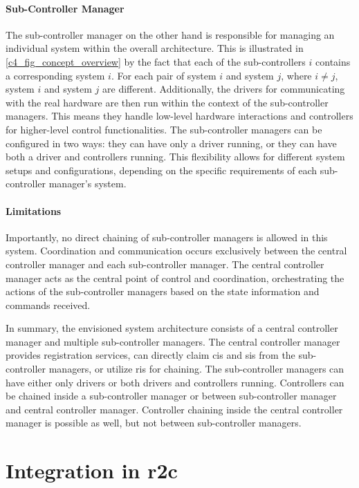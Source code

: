 \paragraph{Sub-Controller Manager}
The sub-controller manager on the other hand is responsible for managing an individual system within the overall architecture. This is illustrated in \autoref{c4_fig_concept_overview} by the fact that each of the sub-controllers $i$ contains a corresponding system $i$. For each pair of system $i$ and system $j$, where $i\neq j$, system $i$ and system $j$ are different. \newline
Additionally, the drivers for communicating with the real hardware are then run within the context of the sub-controller managers. This means they handle low-level hardware interactions and controllers for higher-level control functionalities.\newline
The sub-controller managers can be configured in two ways: they can have only a driver running, or they can have both a driver and controllers running. This flexibility allows for different system setups and configurations, depending on the specific requirements of each sub-controller manager's system.
\paragraph{Limitations}
Importantly, no direct chaining of sub-controller managers is allowed in this system. Coordination and communication occurs exclusively between the central controller manager and each sub-controller manager. The central controller manager acts as the central point of control and coordination, orchestrating the actions of the sub-controller managers based on the state information and commands received.

In summary, the envisioned system architecture consists of a central controller manager and multiple sub-controller managers. The central controller manager provides registration services, can directly claim \glspl{ci} and \glspl{si} from the sub-controller managers, or utilize \glspl{ri} for chaining. The sub-controller managers can have either only drivers or both drivers and controllers running. Controllers can be chained inside a sub-controller manager or between sub-controller manager and central controller manager. Controller chaining inside the central controller manager is possible as well, but not between sub-controller managers.


\section{Integration in \gls{r2c}}
